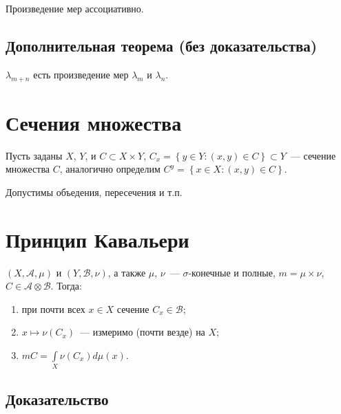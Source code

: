 \documentclass{article}
\begin{document}
            Произведение мер ассоциативно.
    
        \subsection{Дополнительная теорема (без доказательства)}
    
            $\lambda_{m + n}$ есть произведение мер $\lambda_m$ и $\lambda_n$.
        
    \newpage
    
    \section{Сечения множества}
    
        Пусть заданы $X$, $Y$, и $C \subset X \times Y$, $C_x = \left\{ y \in Y : (x, y) \in C \right\} \subset Y$~--- сечение множества $C$, аналогично определим $C^y = \left\{ x \in X : (x, y) \in C \right\}$.
    
        Допустимы объедения, пересечения и т.п.
    
    \newpage

    \section{Принцип Кавальери}
    
        $(X, \mathcal{A}, \mu)$ и $(Y, \mathcal{B}, \nu)$, а также $\mu$, $\nu$~--- $\sigma$-конечные и полные, $m = \mu \times \nu$, $C \in \mathcal{A} \otimes \mathcal{B}$. Тогда:
        
        \begin{enumerate}
        
            \item при почти всех $x \in X$ сечение $C_x \in \mathcal{B}$;
            
            \item $x \mapsto \nu (C_x)$~--- измеримо (почти везде) на $X$;
            
            \item $m C = \int\limits_{X} \nu (C_x) d \mu(x)$.
            
        \end{enumerate}
            
        \subsection{Доказательство}
        
\end{document}
